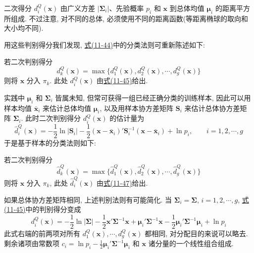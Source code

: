
二次得分 $d_i^Q(\mathbf{x})$ 由广义方差 $|\boldsymbol{\Sigma}_i|$、先验概率 $p_i$ 和 $\mathbf{x}$ 到总体均值 $\boldsymbol{\mu}_i$ 的距离平方所组成. 不过注意, 对不同的总体, 必须使用不同的距离函数(等距离椭球的取向和大小均不同).

用这些判别得分我们发现, \hyperref[eq:11-44]{式(11-44)}中的分类法则可重新陈述如下:

\begin{mvframe}
若二次判别得分
\label{eq:11-46}
\begin{equation}
d_k^Q(\mathbf{x})=\max\{d_1^Q(\mathbf{x}), d_2^Q(\mathbf{x}), \cdots, d_g^Q(\mathbf{x})\}
\tag{11-46}
\end{equation}
则将 $\mathbf{x}$ 分入 $\pi_k$. 此处 $d_i^Q(\mathbf{x})$ 由\hyperref[eq:11-45]{式(11-45)}给出.
\end{mvframe}

实践中 $\boldsymbol{\mu}_i$ 和 $\boldsymbol{\Sigma}_i$ 皆属未知, 但常可获得一组已经正确分类的训练样本, 因此可以用样本均值 $\bar{\mathbf{x}}_i$ 来估计总体均值 $\boldsymbol{\mu}_i$, 以及用样本协方差矩阵 $\mathbf{S}_i$ 来估计总体协方差矩阵 $\boldsymbol{\Sigma}_i$. 此时二次判别得分 $d_i^Q(\mathbf{x})$ 的估计量为
\label{eq:11-47}
\begin{equation}
\hat{d}_i^Q(\mathbf{x})=-\frac{1}{2}\ln|\mathbf{S}_i|-\frac{1}{2}(\mathbf{x}-\bar{\mathbf{x}}_i)'\mathbf{S}_i^{-1}(\mathbf{x}-\bar{\mathbf{x}}_i)+\ln p_i,\qquad i=1,2,\cdots,g
\tag{11-47}
\end{equation}
于是基于样本的分类法则如下:

\begin{mvframe}
若二次判别得分
\label{eq:11-48}
\begin{equation}
\hat{d}_k^Q(\mathbf{x})=\max\{\hat{d}_1^Q(\mathbf{x}), \hat{d}_2^Q(\mathbf{x}), \cdots, \hat{d}_g^Q(\mathbf{x})\}
\tag{11-48}
\end{equation}
则将 $\mathbf{x}$ 分入 $\pi_k$, 此处 $\hat{d}_i^Q(\mathbf{x})$ 由\hyperref[eq:11-47]{式(11-47)}给出.
\end{mvframe}

如果总体协方差矩阵相同, 上述判别法则有可能简化. 当 $\boldsymbol{\Sigma}_i=\boldsymbol{\Sigma}$, $i=1,2,\cdots,g$, \hyperref[eq:11-45]{式(11-45)}中的判别得分变成
\[
d_i^Q(\mathbf{x})=-\frac{1}{2}\ln|\boldsymbol{\Sigma}|-\frac{1}{2}\mathbf{x}'\boldsymbol{\Sigma}^{-1}\mathbf{x}+\boldsymbol{\mu}_i'\boldsymbol{\Sigma}^{-1}\mathbf{x}-\frac{1}{2}\boldsymbol{\mu}_i'\boldsymbol{\Sigma}^{-1}\boldsymbol{\mu}_i+\ln p_i
\]
此式右端的前两项对所有 $d_1^Q(\mathbf{x}),\cdots,d_g^Q(\mathbf{x})$ 都相同, 对分配目的来说可以略去. 剩余诸项由常数项 $c_i=\ln p_i-\frac{1}{2}\boldsymbol{\mu}_i'\boldsymbol{\Sigma}^{-1}\boldsymbol{\mu}_i$ 和 $\mathbf{x}$ 诸分量的一个线性组合组成.

